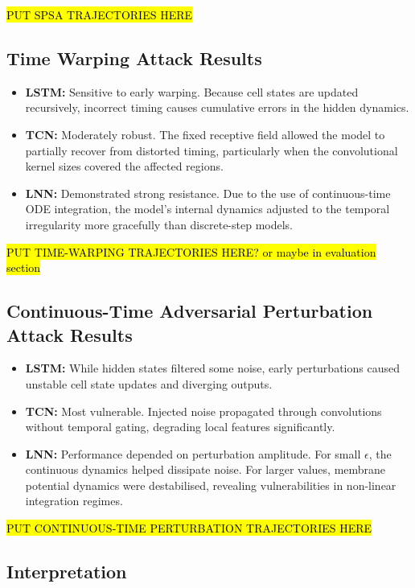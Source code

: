 \hl{PUT SPSA TRAJECTORIES HERE}

\subsection*{Time Warping Attack Results}

\begin{itemize}
    \item \textbf{LSTM:} Sensitive to early warping. Because cell states are updated recursively, incorrect timing causes cumulative errors in the hidden dynamics.
    \item \textbf{TCN:} Moderately robust. The fixed receptive field allowed the model to partially recover from distorted timing, particularly when the convolutional kernel sizes covered the affected regions.
    \item \textbf{LNN:} Demonstrated strong resistance. Due to the use of continuous-time ODE integration, the model's internal dynamics adjusted to the temporal irregularity more gracefully than discrete-step models.
\end{itemize}

\hl{PUT TIME-WARPING TRAJECTORIES HERE? or maybe in evaluation section}

\subsection*{Continuous-Time Adversarial Perturbation Attack Results}

\begin{itemize}
    \item \textbf{LSTM:} While hidden states filtered some noise, early perturbations caused unstable cell state updates and diverging outputs.
    \item \textbf{TCN:} Most vulnerable. Injected noise propagated through convolutions without temporal gating, degrading local features significantly.
    \item \textbf{LNN:} Performance depended on perturbation amplitude. For small $\epsilon$, the continuous dynamics helped dissipate noise. For larger values, membrane potential dynamics were destabilised, revealing vulnerabilities in non-linear integration regimes.
\end{itemize}

\hl{PUT CONTINUOUS-TIME PERTURBATION TRAJECTORIES HERE}


\subsection*{Interpretation}

